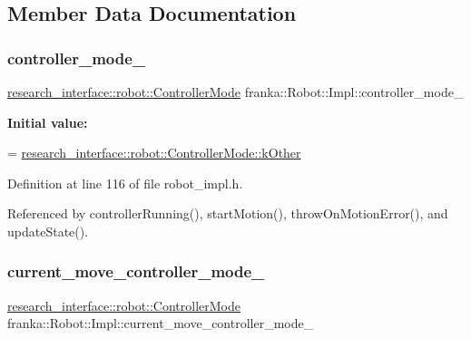\subsection{Member Data Documentation}
\mbox{\label{classfranka_1_1Robot_1_1Impl_aa435885c35275fc60b8de90832ae24df}} 
\subsubsection{\texorpdfstring{controller\+\_\+mode\+\_\+}{controller\_mode\_}}
{\footnotesize\ttfamily \hyperlink{namespaceresearch__interface_1_1robot_a54ee0c8bfefd2ee8a46837ca6d2b1213}{research\+\_\+interface\+::robot\+::\+Controller\+Mode} franka\+::\+Robot\+::\+Impl\+::controller\+\_\+mode\+\_\+\hspace{0.3cm}{\ttfamily [private]}}

{\bfseries Initial value\+:}
\begin{DoxyCode}
=
      \hyperlink{namespaceresearch__interface_1_1robot_a54ee0c8bfefd2ee8a46837ca6d2b1213a341b8a8f03cf33821c46aa5c3aad4b7a}{research\_interface::robot::ControllerMode::kOther}
\end{DoxyCode}


Definition at line 116 of file robot\+\_\+impl.\+h.



Referenced by controller\+Running(), start\+Motion(), throw\+On\+Motion\+Error(), and update\+State().

\mbox{\label{classfranka_1_1Robot_1_1Impl_ab5d1a7e855dae2453635da08440c375e}} 
\subsubsection{\texorpdfstring{current\+\_\+move\+\_\+controller\+\_\+mode\+\_\+}{current\_move\_controller\_mode\_}}
{\footnotesize\ttfamily \hyperlink{namespaceresearch__interface_1_1robot_a54ee0c8bfefd2ee8a46837ca6d2b1213}{research\+\_\+interface\+::robot\+::\+Controller\+Mode} franka\+::\+Robot\+::\+Impl\+::current\+\_\+move\+\_\+controller\+\_\+mode\+\_\+\hspace{0.3cm}{\ttfamily [private]}}



